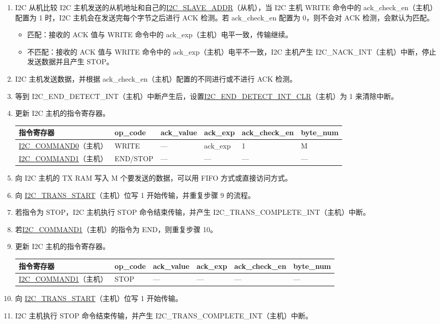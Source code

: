 \documentclass[main\_\_CN.tex]{subfiles}
\begin{document}
\begin{enumerate}
\item I2C 从机比较 I2C 主机发送的从机地址和自己的\hyperref[fielddesc:I2CSLAVEADDR]{I2C\_SLAVE\_ADDR}（从机），当 I2C 主机 WRITE 命令中的 ack\_check\_en（主机）配置为 1 时，I2C 主机会在发送完每个字节之后进行 ACK 检测。若 ack\_check\_en 配置为 0，则不会对 ACK 检测，会默认为匹配。
\begin{itemize}
\item 匹配：接收的 ACK 值与 WRITE 命令中的 ack\_exp（主机）电平一致，传输继续。
\item 不匹配：接收的 ACK 值与 WRITE 命令中的 ack\_exp（主机）电平不一致，I2C 主机产生 I2C\_NACK\_INT（主机）中断，停止发送数据并且产生 STOP。
\end{itemize}
\item I2C 主机发送数据，并根据 ack\_check\_en（主机）配置的不同进行或不进行 ACK 检测。
\item 等到 I2C\_END\_DETECT\_INT（主机）中断产生后，设置\hyperref[fielddesc:I2CENDDETECTINTCLR]{I2C\_END\_DETECT\_INT\_CLR}（主机）为 1 来清除中断。
\item 更新 I2C 主机的指令寄存器。
\begin{longtable}{ | p{4cm} | p{2cm} | p{2cm} | p{2cm} |p{2cm} | p{2cm} |}
\hline\rowcolor{lightgray}
指令寄存器& op\_code & ack\_value&ack\_exp&ack\_check\_en&byte\_num  \\ \hline
\hyperref[fielddesc:I2CCOMMAND0]{I2C\_COMMAND0}（主机）& WRITE& ---&ack\_exp&1&M  \\ \hline
\hyperref[fielddesc:I2CCOMMAND1]{I2C\_COMMAND1}（主机）& END/STOP& ---&---&---&---  \\ \hline
\end{longtable}
\item 向 I2C 主机的 TX RAM 写入 M 个要发送的数据，可以用 FIFO 方式或直接访问方式。
\item 向 \hyperref[fielddesc:I2CTRANSSTART]{I2C\_TRANS\_START}（主机）位写 1 开始传输，并重复步骤 9 的流程。
\item 若指令为 STOP，I2C 主机执行 STOP 命令结束传输，并产生 I2C\_TRANS\_COMPLETE\_INT（主机）中断。
\item 若\hyperref[fielddesc:I2CCOMMAND1]{I2C\_COMMAND1}（主机）的指令为 END，则重复步骤 10。
\item 更新 I2C 主机的指令寄存器。
\begin{longtable}{ | p{4cm} | p{2cm} | p{2cm} | p{2cm} |p{2cm} | p{2cm} |}
\hline\rowcolor{lightgray}
指令寄存器& op\_code & ack\_value&ack\_exp&ack\_check\_en&byte\_num  \\ \hline
\hyperref[fielddesc:I2CCOMMAND1]{I2C\_COMMAND1}（主机）& STOP& ---&---&---&---  \\ \hline
\end{longtable}
\item 向 \hyperref[fielddesc:I2CTRANSSTART]{I2C\_TRANS\_START}（主机）位写 1 开始传输。
\item I2C 主机执行 STOP 命令结束传输，并产生 I2C\_TRANS\_COMPLETE\_INT（主机）中断。
\end{enumerate}
\end{document}
